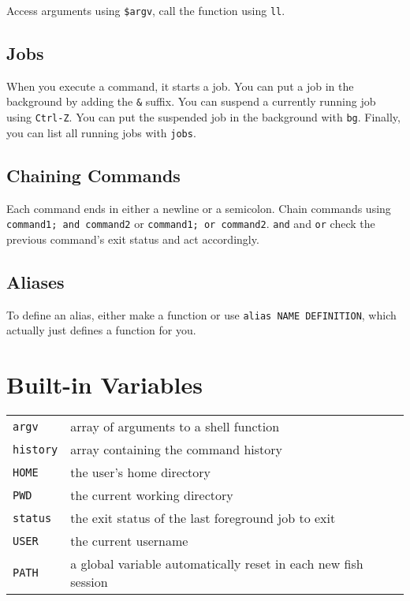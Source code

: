 \documentclass[10pt]{extarticle}
\begin{document}
\begin{paracol}{2}
Access arguments using \texttt{\$argv}, call the function using \texttt{ll}.

\subsection*{Jobs}

When you execute a command, it starts a job.
You can put a job in the background by adding the \texttt{\&} suffix.
You can suspend a currently running job using \texttt{Ctrl-Z}.
You can put the suspended job in the background with \texttt{bg}.
Finally, you can list all running jobs with \texttt{jobs}.

\subsection*{Chaining Commands}

Each command ends in either a newline or a semicolon.
Chain commands using \texttt{command1; and command2} or \texttt{command1; or command2}.
\texttt{and} and \texttt{or} check the previous command's exit status and act accordingly.

\subsection*{Aliases}

To define an alias, either make a function or use \texttt{alias NAME DEFINITION}, which actually just defines a function for you.

\switchcolumn{}

\section*{Built-in Variables}

\begin{tabularx}{\columnwidth}{X X}
    \texttt{argv} & array of arguments to a shell function\\
    \texttt{history} & array containing the command history\\
    \texttt{HOME} & the user's home directory\\
    \texttt{PWD} & the current working directory\\
    \texttt{status} & the exit status of the last foreground job to exit\\
    \texttt{USER} & the current username \\
    \texttt{PATH} & a global variable automatically reset in each new fish session
\end{tabularx}



\end{paracol}
\end{document}
